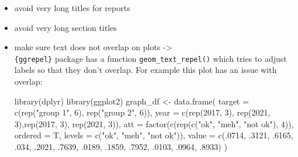 \documentclass[
  letterpaper,
  DIV=11,
  numbers=noendperiod]{scrreprt}
\newenvironment{Shaded}{\begin{snugshade}}{\end{snugshade}}
\newcommand{\AttributeTok}[1]{\textcolor[rgb]{0.40,0.45,0.13}{#1}}
\newcommand{\DecValTok}[1]{\textcolor[rgb]{0.68,0.00,0.00}{#1}}
\newcommand{\FunctionTok}[1]{\textcolor[rgb]{0.28,0.35,0.67}{#1}}
\newcommand{\NormalTok}[1]{\textcolor[rgb]{0.00,0.23,0.31}{#1}}
\newcommand{\OtherTok}[1]{\textcolor[rgb]{0.00,0.23,0.31}{#1}}
\newcommand{\StringTok}[1]{\textcolor[rgb]{0.13,0.47,0.30}{#1}}
\begin{document}
\begin{itemize}
\item
  avoid very long titles for reports
\item
  avoid very long section titles
\item
  make sure text does not overlap on plots -\textgreater{}\\
  \texttt{\{ggrepel\}} package has a function
  \texttt{geom\_text\_repel()} which tries to adjust labels so that they
  don't overlap. For example this plot has an issue with overlap:

\begin{Shaded}
\begin{Highlighting}[]
\FunctionTok{library}\NormalTok{(dplyr)}
\FunctionTok{library}\NormalTok{(ggplot2)}
\NormalTok{graph\_df }\OtherTok{\textless{}{-}} \FunctionTok{data.frame}\NormalTok{(}
  \AttributeTok{target =} \FunctionTok{c}\NormalTok{(}\FunctionTok{rep}\NormalTok{(}\StringTok{"group 1"}\NormalTok{, }\DecValTok{6}\NormalTok{), }\FunctionTok{rep}\NormalTok{(}\StringTok{"group 2"}\NormalTok{, }\DecValTok{6}\NormalTok{)),}
  \AttributeTok{year =}  \FunctionTok{c}\NormalTok{(}\FunctionTok{rep}\NormalTok{(}\DecValTok{2017}\NormalTok{, }\DecValTok{3}\NormalTok{), }\FunctionTok{rep}\NormalTok{(}\DecValTok{2021}\NormalTok{, }\DecValTok{3}\NormalTok{),}\FunctionTok{rep}\NormalTok{(}\DecValTok{2017}\NormalTok{, }\DecValTok{3}\NormalTok{), }\FunctionTok{rep}\NormalTok{(}\DecValTok{2021}\NormalTok{, }\DecValTok{3}\NormalTok{)),}
  \AttributeTok{att =} \FunctionTok{factor}\NormalTok{(}\FunctionTok{c}\NormalTok{(}\FunctionTok{rep}\NormalTok{(}\FunctionTok{c}\NormalTok{(}\StringTok{"ok"}\NormalTok{, }\StringTok{"meh"}\NormalTok{, }\StringTok{"not ok"}\NormalTok{), }\DecValTok{4}\NormalTok{)), }\AttributeTok{ordered =}\NormalTok{ T, }\AttributeTok{levels =} \FunctionTok{c}\NormalTok{(}\StringTok{"ok"}\NormalTok{, }\StringTok{"meh"}\NormalTok{, }\StringTok{"not ok"}\NormalTok{)),}
  \AttributeTok{value =} \FunctionTok{c}\NormalTok{(.}\DecValTok{0714}\NormalTok{, .}\DecValTok{3121}\NormalTok{, .}\DecValTok{6165}\NormalTok{, .}\DecValTok{034}\NormalTok{, .}\DecValTok{2021}\NormalTok{, .}\DecValTok{7639}\NormalTok{, .}\DecValTok{0189}\NormalTok{, .}\DecValTok{1859}\NormalTok{, .}\DecValTok{7952}\NormalTok{, .}\DecValTok{0103}\NormalTok{, .}\DecValTok{0964}\NormalTok{, .}\DecValTok{8933}\NormalTok{)}
\NormalTok{)}


\end{Highlighting}
\end{Shaded}
\end{itemize}
\end{document}
